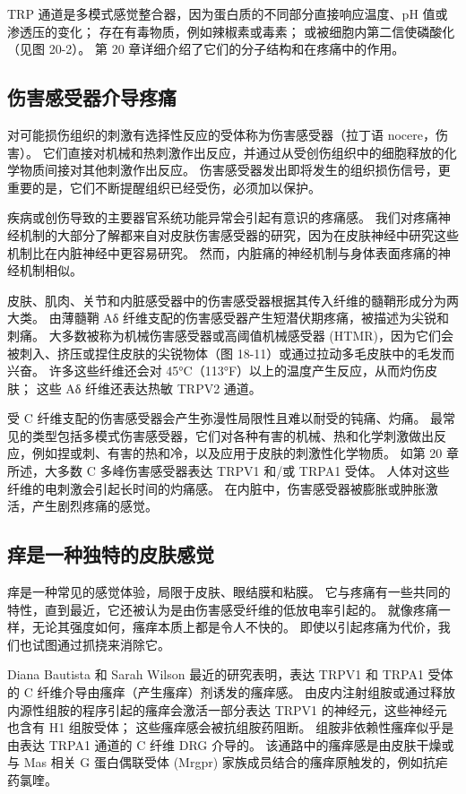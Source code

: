 TRP 通道是多模式感觉整合器，因为蛋白质的不同部分直接响应温度、pH 值或渗透压的变化； 存在有毒物质，例如辣椒素或毒素； 或被细胞内第二信使磷酸化（见图 20-2）。 第 20 章详细介绍了它们的分子结构和在疼痛中的作用。

\subsection{伤害感受器介导疼痛}
对可能损伤组织的刺激有选择性反应的受体称为伤害感受器（拉丁语 nocere，伤害）。 它们直接对机械和热刺激作出反应，并通过从受创伤组织中的细胞释放的化学物质间接对其他刺激作出反应。 伤害感受器发出即将发生的组织损伤信号，更重要的是，它们不断提醒组织已经受伤，必须加以保护。

疾病或创伤导致的主要器官系统功能异常会引起有意识的疼痛感。 我们对疼痛神经机制的大部分了解都来自对皮肤伤害感受器的研究，因为在皮肤神经中研究这些机制比在内脏神经中更容易研究。 然而，内脏痛的神经机制与身体表面疼痛的神经机制相似。

皮肤、肌肉、关节和内脏感受器中的伤害感受器根据其传入纤维的髓鞘形成分为两大类。 由薄髓鞘 Aδ 纤维支配的伤害感受器产生短潜伏期疼痛，被描述为尖锐和刺痛。 大多数被称为机械伤害感受器或高阈值机械感受器 (HTMR)，因为它们会被刺入、挤压或捏住皮肤的尖锐物体（图 18-11）或通过拉动多毛皮肤中的毛发而兴奋。 许多这些纤维还会对 45°C（113°F）以上的温度产生反应，从而灼伤皮肤； 这些 Aδ 纤维还表达热敏 TRPV2 通道。

受 C 纤维支配的伤害感受器会产生弥漫性局限性且难以耐受的钝痛、灼痛。 最常见的类型包括多模式伤害感受器，它们对各种有害的机械、热和化学刺激做出反应，例如捏或刺、有害的热和冷，以及应用于皮肤的刺激性化学物质。 如第 20 章所述，大多数 C 多峰伤害感受器表达 TRPV1 和/或 TRPA1 受体。 人体对这些纤维的电刺激会引起长时间的灼痛感。 在内脏中，伤害感受器被膨胀或肿胀激活，产生剧烈疼痛的感觉。

\subsection{痒是一种独特的皮肤感觉}
痒是一种常见的感觉体验，局限于皮肤、眼结膜和粘膜。 它与疼痛有一些共同的特性，直到最近，它还被认为是由伤害感受纤维的低放电率引起的。 就像疼痛一样，无论其强度如何，瘙痒本质上都是令人不快的。 即使以引起疼痛为代价，我们也试图通过抓挠来消除它。

Diana Bautista 和 Sarah Wilson 最近的研究表明，表达 TRPV1 和 TRPA1 受体的 C 纤维介导由瘙痒（产生瘙痒）剂诱发的瘙痒感。 由皮内注射组胺或通过释放内源性组胺的程序引起的瘙痒会激活一部分表达 TRPV1 的神经元，这些神经元也含有 H1 组胺受体； 这些瘙痒感会被抗组胺药阻断。 组胺非依赖性瘙痒似乎是由表达 TRPA1 通道的 C 纤维 DRG 介导的。 该通路中的瘙痒感是由皮肤干燥或与 Mas 相关 G 蛋白偶联受体 (Mrgpr) 家族成员结合的瘙痒原触发的，例如抗疟药氯喹。

